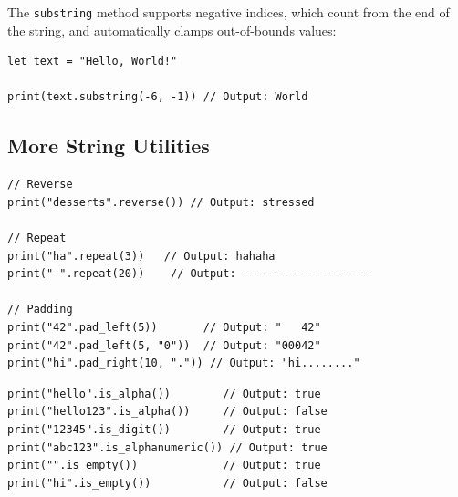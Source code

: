 The \lstinline|substring| method supports negative indices, which count from the end of the string, and automatically clamps out-of-bounds values:

\begin{lstlisting}[language=Lattice, caption={Negative indices in substring}]
let text = "Hello, World!"

print(text.substring(-6, -1)) // Output: World
\end{lstlisting}

\subsection{More String Utilities}\label{sec:string-utilities}

\begin{lstlisting}[language=Lattice, caption={reverse, repeat, and padding}]
// Reverse
print("desserts".reverse()) // Output: stressed

// Repeat
print("ha".repeat(3))   // Output: hahaha
print("-".repeat(20))    // Output: --------------------

// Padding
print("42".pad_left(5))       // Output: "   42"
print("42".pad_left(5, "0"))  // Output: "00042"
print("hi".pad_right(10, ".")) // Output: "hi........"
\end{lstlisting}

\begin{lstlisting}[language=Lattice, caption={String validation methods}]
print("hello".is_alpha())        // Output: true
print("hello123".is_alpha())     // Output: false
print("12345".is_digit())        // Output: true
print("abc123".is_alphanumeric()) // Output: true
print("".is_empty())             // Output: true
print("hi".is_empty())           // Output: false
\end{lstlisting}

